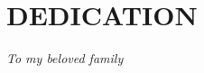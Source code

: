 \chapter*{DEDICATION}\thispagestyle{headings}
\begin{flushright}
  \itshape
To my beloved family
\end{flushright}

